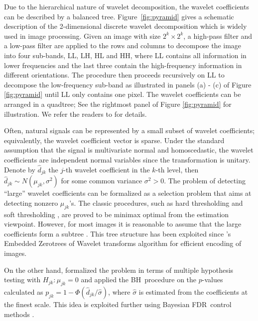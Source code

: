 \documentclass{biometrika}
\newcommand{\textFDR}{FDR}
\newcommand{\bh}{BH}
\newcommand{\1}{\mathbf{1}}
\begin{document}
Due to the hierarchical nature of wavelet decomposition, the wavelet coefficients can be described by a balanced tree. Figure~\ref{fig:pyramid} gives a schematic description of the 2-dimensional discrete wavelet decomposition which is widely used in image processing. Given an image with size $2^{k}\times 2^{k}$, a high-pass filter and a low-pass filter are applied to the rows and columns to decompose the image into four sub-bands, LL, LH, HL and HH, where LL contains all information in lower frequencies and the last three contain the high-frequency information in different orientations. The procedure then proceeds recursively on LL to decompose the low-frequency sub-band as illustrated in panels (a) - (c) of Figure \ref{fig:pyramid} until LL only contains one pixel. The wavelet coefficients can be arranged in a quadtree; See the rightmost panel of Figure \ref{fig:pyramid} for illustration. We refer the readers to \cite{mallat99} for details. 


Often, natural signals can be represented by a small subset of wavelet coefficients; equivalently, the wavelet coefficient vector is sparse. Under the standard assumption that the signal is multivariate normal and homoscedastic, the wavelet coefficients are independent normal variables since the transformation is unitary. Denote by $\hat{d}_{jk}$ the $j$-th wavelet coefficient in the $k$-th level, then $\hat{d}_{jk}\sim N(\mu_{jk}, \sigma^{2})$ for some common variance $\sigma^{2} > 0$. The problem of detecting ``large'' wavelet coefficients can be formalized as a selection problem that aims at detecting nonzero $\mu_{jk}$'s. The classic procedures, such as hard thresholding \citep{donoho94} and soft thresholding \citep{donoho95}, are proved to be minimax optimal from the estimation viewpoint. However, for most images it is reasonable to assume that the large coefficients form a subtree \citep[e.g.,][]{shapiro93, hegde15}. This tree structure has been exploited since \cite{shapiro93}'s Embedded Zerotrees of Wavelet transforms algorithm for efficient encoding of images. 

On the other hand, \citep{abramovich96} formalized the problem in terms of multiple hypothesis testing with $H_{jk}: \mu_{jk} = 0$ and applied the \bh ~procedure on the $p$-values calculated as $p_{jk} = 1 - \Phi(\hat{d}_{jk} / \hat{\sigma})$, where $\hat{\sigma}$ is estimated from the coefficients at the finest scale. This idea is exploited further using Bayesian \textFDR ~control methods \citep[e.g.,][]{tadesse05, lavrik08}. 
\end{document}
